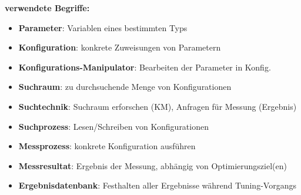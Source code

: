   \begin{frame}
    \textbf{verwendete Begriffe:}
    
  \begin{itemize}

    \item \textbf{Parameter}: Variablen eines bestimmten Typs 
    
    \item \textbf{Konfiguration}: konkrete Zuweisungen von Parametern
    \item \textbf{Konfigurations-Manipulator}: Bearbeiten der Parameter in Konfig. \newline
    
    \item \textbf{Suchraum}: zu durchsuchende Menge von Konfigurationen
    
    \item \textbf{Suchtechnik}: Suchraum erforschen (KM), Anfragen für Messung (Ergebnis)
     
    \item \textbf{Suchprozess}: Lesen/Schreiben von Konfigurationen \newline
    \item \textbf{Messprozess}: konkrete Konfiguration ausführen
    \item \textbf{Messresultat}: Ergebnis der Messung, abhängig von Optimierungsziel(en)
    \item \textbf{Ergebnisdatenbank}: Festhalten aller Ergebnisse während Tuning-Vorgangs
    
  \end{itemize}
  \end{frame}
        
      
